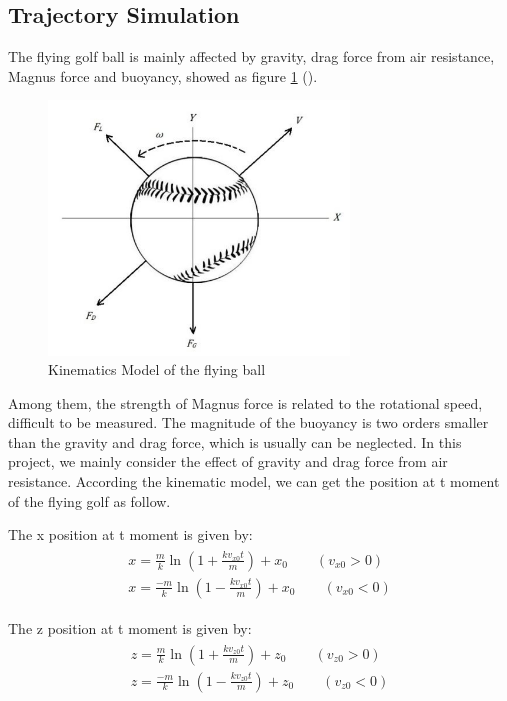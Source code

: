 \subsection{Trajectory Simulation}
The flying golf ball is mainly affected by gravity, drag force from air resistance, Magnus force and buoyancy, showed as figure \ref{fig:model2} (\cite{martin2012evaluation}). 
\begin{figure}[H]
    \centering
    \includegraphics[width=8cm]{figure/KM.png}
    \caption{Kinematics Model of the flying ball}
    \label{fig:model2}
\end{figure}
Among them, the strength of Magnus force is related to the rotational speed, difficult to be measured. The magnitude of the buoyancy is two orders smaller than the gravity and drag force, which is usually can be neglected. In this project, we mainly consider the effect of gravity and drag force from air resistance. According the kinematic model, we can get the position at t moment of the flying golf as follow.

The x position at t moment is given by:
\begin{align}
\begin{split}
  x=\frac{m}{k} \ln \left(1+\frac{k v_{x 0} t}{m}\right)+x_{0} \qquad(v_{x 0}>0)\\ 
  x=\frac{-m}{k} \ln \left(1-\frac{k v_{x 0} t}{m}\right)+x_{0} \qquad(v_{x 0}<0)
\end{split}
\end{align}

The z position at t moment is given by:
\begin{align}
\begin{split}
 z=\frac{m}{k} \ln \left(1+\frac{k v_{z 0} t}{m}\right)+z_{0}  \qquad(v_{z 0}>0)\\ 
z=\frac{-m}{k} \ln \left(1-\frac{k v_{z 0} t}{m}\right)+z_{0} \qquad(v_{z 0}<0)
\end{split}
\end{align}

